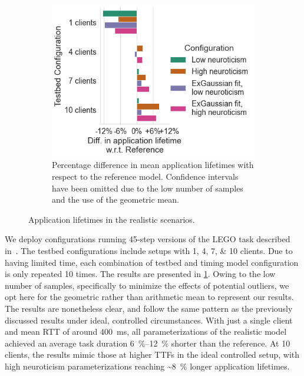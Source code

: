 \begin{figure}
\begin{subfigure}[]{\columnwidth}
        \includegraphics[width=\textwidth]{figs/new_model/lifetime_testbed_diff.png}
        \caption{%
            Percentage difference in mean application lifetimes with respect to the reference model.
            Confidence intervals have been omitted due to the low number of samples and the use of the geometric mean.
        }
    \end{subfigure}
    \caption{Application lifetimes in the realistic scenarios.}\label{fig:testbed_lifetimes}
\end{figure}

We deploy configurations running \num{45}-step versions of the LEGO task described in~\cite{olguinmunoz:impact2021}.
The testbed configurations include setups with \numlist{1;4;7;10} clients.
Due to having limited time, each combination of testbed and timing model configuration is only repeated \num{10} times.
The results are presented in \cref{fig:testbed_lifetimes}.
Owing to the low number of samples, specifically to minimize the effects of potential outliers, we opt here for the geometric rather than arithmetic mean to represent our results.
The results are nonetheless clear, and follow the same pattern as the previously discussed results under ideal, controlled circumstances.
With just a single client and mean \ac{RTT} of around \SI{400}{\milli\second}, all parameterizations of the realistic model achieved an average task duration \SIrange{6}{12}{\percent} shorter than the reference.
At \num{10} clients, the results mimic those at higher \acp{TTF} in the ideal controlled setup, with high neuroticism parameterizations reaching \textasciitilde\SI{8}{\percent} longer application lifetimes.

